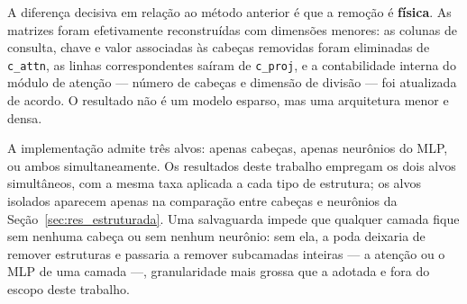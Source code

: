 \begin{figure}[htb]
\end{figure}

A diferença decisiva em relação ao método anterior é que a remoção é \textbf{física}. As
matrizes foram efetivamente reconstruídas com dimensões menores: as colunas de consulta,
chave e valor associadas às cabeças removidas foram eliminadas de \texttt{c\_attn}, as
linhas correspondentes saíram de \texttt{c\_proj}, e a contabilidade interna do módulo de
atenção --- número de cabeças e dimensão de divisão --- foi atualizada de acordo. O
resultado não é um modelo esparso, mas uma arquitetura menor e densa.

A implementação admite três alvos: apenas cabeças, apenas neurônios do MLP, ou ambos
simultaneamente. Os resultados deste trabalho empregam os dois alvos
simultâneos, com a mesma taxa aplicada a cada tipo de estrutura; os alvos isolados
aparecem apenas na comparação entre cabeças e neurônios da
Seção~\ref{sec:res_estruturada}. Uma salvaguarda impede que qualquer camada fique sem
nenhuma cabeça ou sem nenhum neurônio: sem ela, a poda deixaria de remover estruturas e
passaria a remover subcamadas inteiras --- a atenção ou o MLP de uma camada ---,
granularidade mais grossa que a adotada e fora do escopo deste trabalho.

